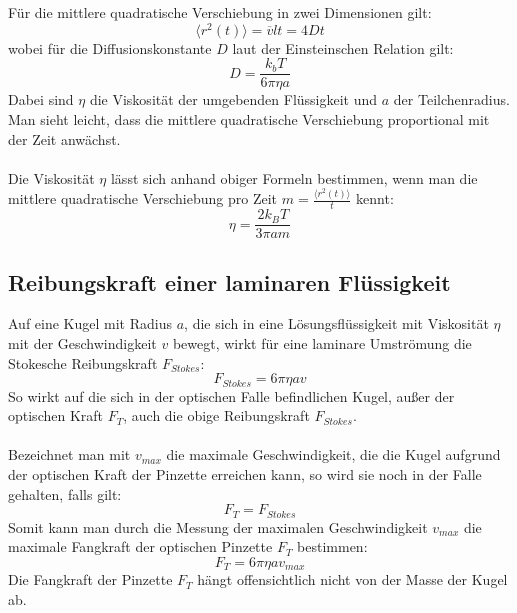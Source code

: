 \documentclass[a4paper,titlepage]{scrartcl}
\numberwithin{equation}{section}
\begin{document}
Für die mittlere quadratische Verschiebung in zwei Dimensionen gilt:
\begin{equation}
\langle r^2(t) \rangle=\overline{v}lt=4Dt
\label{eq:dmsDiffusion}
\end{equation}
wobei für die Diffusionskonstante $D$ laut der Einsteinschen Relation gilt:
\begin{equation}
D=\frac{k_bT}{6\pi \eta a}
\label{eq:diffusionskonstante}
\end{equation}
Dabei sind $\eta$ die Viskosität der umgebenden Flüssigkeit und $a$ der Teilchenradius. Man sieht leicht, dass die mittlere quadratische Verschiebung proportional mit der Zeit anwächst.\\ \\
Die Viskosität $\eta$ lässt sich anhand obiger Formeln bestimmen, wenn man die mittlere quadratische Verschiebung pro Zeit $m=\frac{\langle r^2(t) \rangle}{t}$ kennt:
\begin{equation*}
\eta=\frac{2k_BT}{3 \pi a m}
\end{equation*}
\subsection{Reibungskraft einer laminaren Flüssigkeit}
Auf eine Kugel mit Radius $a$, die sich in eine Lösungsflüssigkeit mit Viskosität $\eta$ mit der Geschwindigkeit $v$ bewegt, wirkt für eine laminare Umströmung die Stokesche Reibungskraft $F_{Stokes}$:
\begin{equation*}
F_{Stokes}=6 \pi \eta a v
\end{equation*}
So wirkt auf die sich in der optischen Falle befindlichen Kugel, außer der optischen Kraft $F_T$, auch die obige Reibungskraft $F_{Stokes}$.\\\\
Bezeichnet man mit $v_{max}$ die maximale Geschwindigkeit, die die Kugel aufgrund der optischen Kraft der Pinzette erreichen kann, so wird sie noch in der Falle gehalten, falls gilt:
\begin{equation*}
F_T=F_{Stokes}
\end{equation*}
Somit kann man durch die Messung der maximalen Geschwindigkeit $v_{max}$ die maximale Fangkraft der optischen Pinzette $F_T$ bestimmen:
\begin{equation}
F_T=6 \pi \eta a v_{max}
\label{eq:fangkraft}
\end{equation}
Die Fangkraft der Pinzette $F_T$ hängt offensichtlich nicht von der Masse der Kugel ab.
\end{document}
